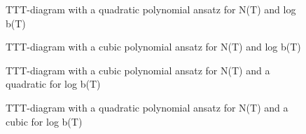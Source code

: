 \documentclass{article}%
\begin{document}
\begin{figure}[h]
\centering
{} %
\caption{TTT-diagram with a quadratic polynomial ansatz for N(T) and log b(T)}
\label{fig:NbFitQuad}
\end{figure}

\begin{figure}[h]
\centering
{} %
\caption{TTT-diagram with a cubic polynomial ansatz for N(T) and log b(T)}
\label{fig:NbFitCubic}
\end{figure}

\begin{figure}[h]
\centering
{} %
\caption{TTT-diagram with a cubic polynomial ansatz for N(T) and a quadratic for log b(T)}
\label{fig:NbFitNcubebquad}
\end{figure}
\begin{figure}[h]
\centering
{} %
\caption{TTT-diagram with a quadratic polynomial ansatz for N(T) and a cubic for log b(T)}
\label{fig:NbFitNquadbcube}
\end{figure}
\end{document}
